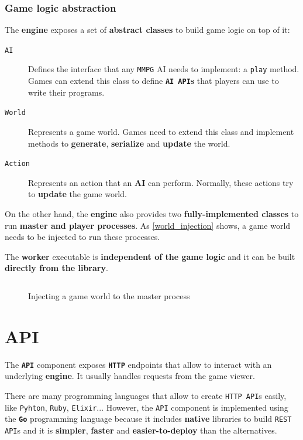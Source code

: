 \documentclass[a4paper,11pt,titlepage,abstract,numbers=noenddot,automark,mnsy,intlimits,rgb,dvipsnames]{report}
\begin{document}
\subsection{Game logic abstraction}
\indent
The \textbf{engine} exposes a set of \textbf{abstract classes} to build game logic on top of it:
\begin{description}
\item[\texttt{AI}]
Defines the interface that any \texttt{MMPG} AI needs to implement: a \texttt{play} method. Games can extend
  this class to define \textbf{\texttt{AI API}s} that players can use to write their programs.
\item[\texttt{World}]
Represents a game world. Games need to extend this class and implement methods to
  \textbf{generate}, \textbf{serialize} and \textbf{update} the world.
\item[\texttt{Action}]
Represents an action that an \textbf{AI} can perform. Normally, these actions try to \textbf{update}
  the game world.
\end{description}
On the other hand, the \textbf{engine} also provides two \textbf{fully-implemented classes} to run \textbf{master and player
processes}. As \autoref{world_injection} shows, a game world needs to be injected to run these processes.

The \textbf{worker} executable is \textbf{independent of the game logic} and it can be built \textbf{directly from the library}.
\begin{figure}[H]
\inputminted[linenos,fontsize=\small,frame=lines,framesep=2mm]{c++}{code/master.cpp}
\caption{Injecting a game world to the master process}
\label{world_injection}
\end{figure}
\clearpage
\chapter{API}
The \textbf{\texttt{API}} component exposes \textbf{\texttt{HTTP}} endpoints that allow to interact with an underlying \textbf{engine}. It
usually handles requests from the game viewer.

There are many programming languages that allow to create \texttt{HTTP API}s easily, like \texttt{Pyhton}, \texttt{Ruby}, \texttt{Elixir}... However,
the \texttt{API} component is implemented using the \textbf{\texttt{Go}} programming language because it includes \textbf{native}
libraries to build \texttt{REST API}s and it is \textbf{simpler}, \textbf{faster} and \textbf{easier-to-deploy} than the alternatives.
\end{document}
